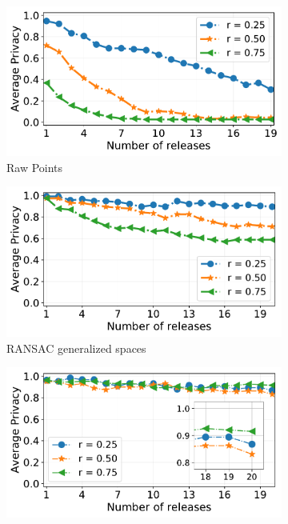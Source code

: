 \begin{figure}[t!]
	\centering
	\begin{subfigure}[]{0.49\columnwidth}
		\centering
		\includegraphics[width=\textwidth]{figures/plots/2-successive-complete-ranked}
	    \caption{Raw Points}
	\label{fig:successive-complete}
	\end{subfigure}
	\begin{subfigure}[]{0.49\columnwidth}
		\centering
		\includegraphics[width=\textwidth]{figures/plots/2-successive-ransac-ranked}
    	\caption{RANSAC generalized spaces}
    	\label{fig:successive-ransac}
	\end{subfigure}
	\begin{subfigure}[]{0.49\columnwidth}
		\centering
		\includegraphics[width=\textwidth]{figures/plots/2-successive-local-ranked}

\end{subfigure}
\end{figure}
